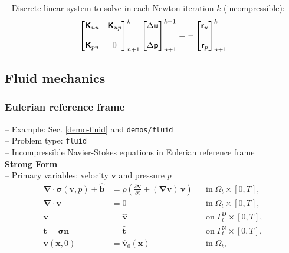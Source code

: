 \documentclass[a4paper,12pt]{report}
\newcommand{\bs}[1]{\boldsymbol{#1}}
\newcommand{\Om}{\mathit{\Omega}}
\newcommand{\Gm}{\mathit{\Gamma}}
\newcommand{\zerom}{\textcolor{lightgray}{\bs{\mathsf{0}}}}
\newcommand{\ROP}{\bs{\mathsf{r}}}
\begin{document}
-- Discrete linear system to solve in each Newton iteration $k$ (incompressible):
\begin{equation}
\label{equation-lin-sys-solid-inc}
\begin{aligned}
\begin{bmatrix} \bs{\mathsf{K}}_{uu} & \bs{\mathsf{K}}_{up} \\ \\ \bs{\mathsf{K}}_{pu} & \zerom \end{bmatrix}_{n+1}^{k}\begin{bmatrix} \Delta\bs{\mathsf{u}} \\ \\ \Delta\bs{\mathsf{p}} \end{bmatrix}_{n+1}^{k+1}=-\begin{bmatrix} \ROP_{u} \\ \\ \ROP_{p} \end{bmatrix}_{n+1}^{k}
\end{aligned}
\end{equation}




\subsection{Fluid mechanics}\label{fluid-mechanics}

\subsubsection{Eulerian reference frame}\label{eulerian-reference-frame}

-- Example: Sec. \ref{demo-fluid} and \verb"demos/fluid"\\

-- Problem type: \verb.fluid.\\

-- Incompressible Navier-Stokes equations in Eulerian reference frame\\

\textbf{Strong Form}\\

-- Primary variables: velocity $\bs{v}$ and pressure $p$
\begin{equation}
\label{equation-fluid-strong-form}
\begin{aligned}
\bs{\nabla} \cdot \bs{\sigma}(\bs{v},p) + \hat{\bs{b}} &= \rho\left(\frac{\partial\bs{v}}{\partial t} + (\bs{\nabla}\bs{v})\,\bs{v}\right) &&\text{in} \; \mathit{\Om}_t \times [0, T], \\
\bs{\nabla}\cdot \bs{v} &= 0 &&\text{in} \; \mathit{\Om}_t \times [0, T],\\
\bs{v} &= \hat{\bs{v}} &&\text{on} \; \mathit{\Gm}_t^{\mathrm{D}} \times [0, T],\\
\bs{t} = \bs{\sigma}\bs{n} &= \hat{\bs{t}} &&\text{on} \; \mathit{\Gm}_t^{\mathrm{N}} \times [0, T],\\
\bs{v}(\bs{x},0) &= \hat{\bs{v}}_{0}(\bs{x}) &&\text{in} \; \mathit{\Om}_t,
\end{aligned}
\end{equation}
\end{document}

